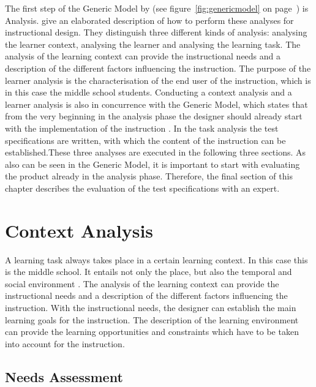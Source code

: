 \documentclass[11pt,twoside]{report} %
\begin{document}
The first step of the Generic Model by  (see figure~\ref{fig:genericmodel} on page~\pageref{fig:genericmodel}) is Analysis.  give an elaborated description of how to perform these analyses for instructional design. They distinguish three different kinds of analysis: analysing the learner context, analysing the learner and analysing the learning task. The analysis of the learning context can provide the instructional needs and a description of the different factors influencing the instruction. The purpose of the learner analysis is the characterisation of the end user of the instruction, which is in this case the middle school students. Conducting a context analysis and a learner analysis is also in concurrence with the Generic Model, which states that from the very beginning in the analysis phase the designer should already start with the implementation of the instruction \cite{genericmodel}. In the task analysis the test specifications are written, with which the content of the instruction can be established.These three analyses are executed in the following three sections. As also can be seen in the Generic Model, it is important to start with evaluating the product already in the analysis phase. Therefore, the final section of this chapter describes the evaluation of the test specifications with an expert.


\section{Context Analysis}

A learning task always takes place in a certain learning context. In this case this is the middle school. It entails not only the place, but also the temporal and social environment \cite{smithragan}. The analysis of the learning context can provide the instructional needs and a description of the different factors influencing the instruction. With the instructional needs, the designer can establish the main learning goals for the instruction. The description of the learning environment can provide the learning opportunities and constraints which have to be taken into account for the instruction.


\subsection{Needs Assessment}
\end{document}
